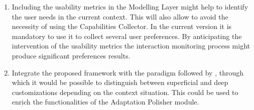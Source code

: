 \begin{enumerate}[label=\alph*)]
  \inputminted[linenos=true, fontsize=\footnotesize, frame=lines]{java}{6_conclusion/api_adaptation.java}

  \item Including the usability metrics in the Modelling Layer might help to
  identify the user needs in the current context. This will also allow to avoid
  the necessity of using the Capabilities Collector. In the current version it
  is mandatory to use it to collect several user preferences. By anticipating
  the intervention of the usability metrics the interaction monitoring process
  might produce significant preferences results.
  
  
  \item Integrate the proposed framework with the paradigm followed by
  \citet{marmolin_medium_1995}, through which it would be possible to distinguish
  between superficial and deep customizations depending on the context situation.
  This could be used to enrich the functionalities of the Adaptation Polisher
  module.
\end{enumerate}